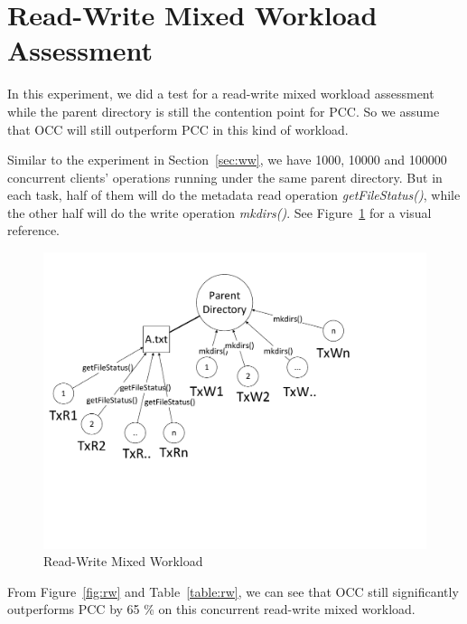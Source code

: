 \section{Read-Write Mixed Workload Assessment}

In this experiment, we did a test for a read-write mixed workload assessment while the parent directory is still the contention point for PCC. So we assume that OCC will still outperform PCC in this kind of workload. 

\noindent Similar to the experiment in Section~\ref{sec:ww}, we have 1000, 10000 and 100000 concurrent clients' operations running under the same parent directory. But in each task, half of them will do the metadata read operation \textit{getFileStatus()}, while the other half will do the write operation \textit{mkdirs()}. See Figure~\ref{fig:rwWorkload} for a visual reference.

\begin{figure}[ht]
	\centering
	\includegraphics[scale=0.6]{figs/rw.pdf}
	\caption{Read-Write Mixed Workload}
	\label{fig:rwWorkload}
\end{figure}

\noindent From Figure~\ref{fig:rw} and Table~\ref{table:rw}, we can see that OCC still significantly outperforms PCC by 65 \% on this concurrent read-write mixed workload. 


